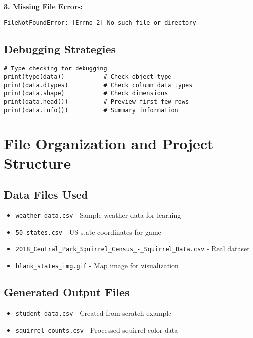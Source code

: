 \documentclass[12pt]{article}
\begin{document}
\textbf{3. Missing File Errors:}
\begin{verbatim}
FileNotFoundError: [Errno 2] No such file or directory
\end{verbatim}

\subsection{Debugging Strategies}

\begin{lstlisting}
# Type checking for debugging
print(type(data))           # Check object type
print(data.dtypes)          # Check column data types
print(data.shape)           # Check dimensions
print(data.head())          # Preview first few rows
print(data.info())          # Summary information
\end{lstlisting}

\section{File Organization and Project Structure}

\subsection{Data Files Used}

\begin{itemize}
    \item \texttt{weather\_data.csv} - Sample weather data for learning
    \item \texttt{50\_states.csv} - US state coordinates for game
    \item \texttt{2018\_Central\_Park\_Squirrel\_Census\_-\_Squirrel\_Data.csv} - Real dataset
    \item \texttt{blank\_states\_img.gif} - Map image for visualization
\end{itemize}

\subsection{Generated Output Files}

\begin{itemize}
    \item \texttt{student\_data.csv} - Created from scratch example
    \item \texttt{squirrel\_counts.csv} - Processed squirrel color data
\end{itemize}
\end{document}

